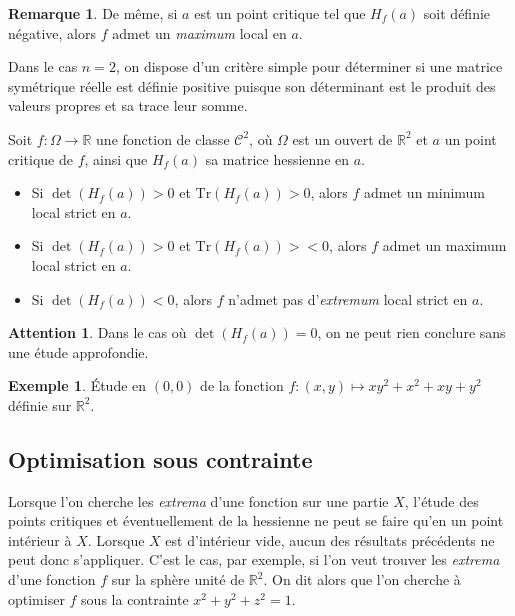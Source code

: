 \documentclass[french]{article}
\newcommand{\R}{\mathbb{R}}
\newcommand{\Tr}{\text{Tr}}
\theoremstyle{plain}
\theoremstyle{definition}
\newtheorem*{ex}{Exemple}
\newtheorem*{rmq}{Remarque}
\newtheorem*{attention}{Attention}
\theoremstyle{remark}
\begin{document}
\begin{rmq}
	De même, si $a$ est un point critique tel que $H_f(a)$ soit définie négative, alors $f$ admet un \textit{maximum} local en $a$.
\end{rmq}

Dans le cas $n=2$, on dispose d'un critère simple pour déterminer si une matrice symétrique réelle est définie positive puisque son déterminant est le produit des valeurs propres et sa trace leur somme.

\begin{met}
	Soit $f:\Omega\to\R$ une fonction de classe $\mathcal{C}^2$, où $\Omega$ est un ouvert de $\R^2$ et $a$ un point critique de $f$, ainsi que $H_f(a)$ sa matrice hessienne en $a$.
	\begin{itemize}
		\item Si $\det(H_f(a))>0$ et $\Tr(H_f(a))>0$, alors $f$ admet un minimum local strict en $a$.
		\item Si $\det(H_f(a))>0$ et $\Tr(H_f(a))><0$, alors $f$ admet un maximum local strict en $a$.
		\item Si $\det(H_f(a))<0$, alors $f$ n'admet pas d'\textit{extremum} local strict en $a$.
	\end{itemize}
\end{met}

\begin{attention}
	Dans le cas où $\det(H_f(a))=0$, on ne peut rien conclure sans une étude approfondie.
\end{attention}

\begin{ex}
	Étude en $(0,0)$ de la fonction $f:(x,y)\mapsto xy^2+x^2+xy+y^2$ définie sur $\R^2$.
\end{ex}

\subsection{Optimisation sous contrainte}

Lorsque l'on cherche les \textit{extrema} d'une fonction sur une partie $X$, l'étude des points critiques et éventuellement de la hessienne ne peut se faire qu'en un point intérieur à $X$. Lorsque $X$ est d'intérieur vide, aucun des résultats précédents ne peut donc s'appliquer. C'est le cas, par exemple, si l'on veut trouver les \textit{extrema} d'une fonction $f$ sur la sphère unité de $\R^2$. On dit alors que l'on cherche à optimiser $f$ sous la contrainte $x^2+y^2+z^2=1$.
\end{document}
